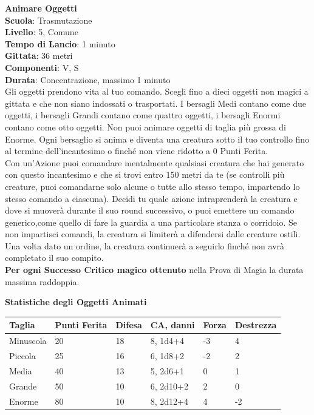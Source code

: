 \begin{multicols}{2}
\medskip\textbf{Animare Oggetti}\\
\textbf{Scuola}: Trasmutazione\\
\textbf{Livello}: 5, Comune\\
\textbf{Tempo di Lancio}: 1 minuto\\
\textbf{Gittata}: 36 metri\\
\textbf{Componenti}: V, S\\
\textbf{Durata}: Concentrazione, massimo 1 minuto\\
Gli oggetti prendono vita al tuo comando. Scegli fino a dieci oggetti non magici a gittata e che non siano indossati o trasportati. I bersagli Medi contano come due oggetti, i bersagli Grandi contano come quattro oggetti, i bersagli Enormi contano come otto oggetti. Non puoi animare oggetti di taglia più grossa di Enorme. Ogni bersaglio si anima e diventa una creatura sotto il tuo controllo fino al termine dell'incantesimo o finché non viene ridotto a 0 Punti Ferita.\\
Con un'Azione puoi comandare mentalmente qualsiasi creatura che hai generato con questo incantesimo e che si trovi entro 150 metri da te (se controlli più creature, puoi comandarne solo alcune o tutte allo stesso tempo, impartendo lo stesso comando a ciascuna). Decidi tu quale azione intraprenderà la creatura e dove si muoverà durante il suo round successivo, o puoi emettere un comando generico,come quello di fare la guardia a una particolare stanza o corridoio. Se non impartisci comandi, la creatura si limiterà a difendersi dalle creature ostili. Una volta dato un ordine, la creatura continuerà a seguirlo finché non avrà completato il suo compito.\\
\textbf{Per ogni Successo Critico magico ottenuto} nella Prova di Magia la durata massima raddoppia.
\bigskip

\end{multicols}

\textbf{Statistiche degli Oggetti Animati}
\bigskip

\begin{tabular}{llllll}
Taglia&Punti Ferita&Difesa&CA, danni&Forza&Destrezza\\
\toprule
Minuscola &20 &18&8, {1d4+4} &-3 &4\\
Piccola &25 &16 &6, {1d8+2} &-2 &2\\
Media &40 &13 &5, {2d6+1} &0 &1\\
Grande &50 &10 &6, {2d10+2}&2 &0\\
Enorme &80 &10 &8, {2d12+4}&4 &-2\\
\end{tabular}

